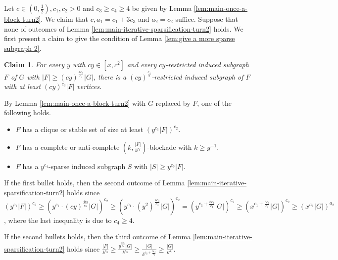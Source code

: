 \documentclass[a4paper,11pt]{article}
\newtheorem{claim}{Claim}[theorem]
\let\oldendproof\endproof
\renewenvironment{proof}[1][\proofname]{%
	\oldproof[\normalfont\bfseries #1]%
}{\oldendproof}
\renewcommand{\qedsymbol}{$\square$}%
\newenvironment{subproof}[1][\normalfont\it Subproof]{%
	\renewcommand{\qedsymbol}{{\tiny{$\blacksquare$}}}%
	\begin{proof}[#1]%
	}{%
	\end{proof}%
}
\begin{document}
    \begin{proof}
        Let $c\in (0,\frac{1}{2}),c_1,c_2>0$ and $c_3\geq c_4\geq 4$ be given by Lemma \ref{lem:main-once-a-block-turn2}. 
        We claim that $c, a_1=c_1+3c_3$ and $a_2=c_2$ suffice. 
        Suppose that none of outcomes of Lemma \ref{lem:main-iterative-sparsification-turn2} holds. 
        We first present a claim to give the condition of Lemma         \ref{lem:give a more sparse subgraph 2}. 
        
        \begin{claim}\label{clm:condition of lemma-give a more sparse subgraph}
            For every $y$ with $cy\in[x,c^2]$ and every $cy$-restricted induced subgraph $F$ of $G$ with $|F|\geq (cy)^{\frac{4c_3}{c_4}}|G|$, there is a $(cy)^{\frac{c_4}{2}}$-restricted induced subgraph of $F$ with at least $(cy)^{c_3}|F|$ vertices. 
        \end{claim}
        \begin{subproof}[Proof of Claim \ref{clm:condition of lemma-give a more sparse subgraph}]
            By Lemma \ref{lem:main-once-a-block-turn2} with $G$ replaced by $F$, one of the following holds. 
            \begin{itemize}
            \item $F$ has a clique or stable set of size at least $(y^{c_1}|F|)^{c_2}$.
            
            \item $F$ has a complete or anti-complete $(k,\frac{|F|}{k^{c_3}})$-blockade with $k\geq y^{-1}$.

            \item $F$ has a $y^{c_4}$-sparse induced subgraph $S$ with $|S|\geq y^{c_3}|F|$. 
         
        \end{itemize}
        
        If the first bullet holds, then the second outcome of Lemma \ref{lem:main-iterative-sparsification-turn2} holds since $(y^{c_1}|F|)^{c_2}
        \geq (y^{c_1}\cdot (cy)^{\frac{4c_3}{c_4}}|G|)^{c_2}
        \geq (y^{c_1}\cdot (y^2)^{\frac{4c_3}{c_4}}|G|)^{c_2}
        = (y^{c_1+\frac{8c_3}{c_4}}|G|)^{c_2}
        \geq (x^{c_1+\frac{8c_3}{c_4}}|G|)^{c_2}
        \geq (x^{a_1}|G|)^{a_2}$, where the last inequality is due to $c_4\ge 4$. 

        If the second bullets holds, then the third outcome of Lemma \ref{lem:main-iterative-sparsification-turn2} holds since $\frac{|F|}{k^{c_3}}\geq \frac{y^{\frac{8c_3}{c_4}}|G|}{k^{c_3}}\geq \frac{|G|}{k^{c_3+\frac{8c_3}{c_4}}}\geq \frac{|G|}{k^{a_1}}$. 



\end{subproof}
\end{proof}
\end{document}
